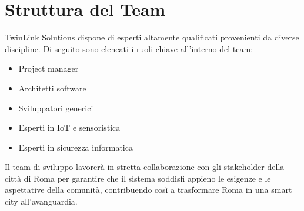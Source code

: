 \section{Struttura del Team}

TwinLink Solutions dispone di esperti altamente qualificati provenienti da diverse discipline. Di seguito sono elencati i ruoli chiave all'interno del team:

\begin{itemize}
    \item Project manager
    \item Architetti software
    \item Sviluppatori generici
    \item Esperti in IoT e sensoristica
    \item Esperti in sicurezza informatica
\end{itemize}

Il team di sviluppo lavorerà in stretta collaborazione con gli stakeholder della città di Roma per garantire che il sistema soddisfi appieno le esigenze e le aspettative della comunità, contribuendo così a trasformare Roma in una smart city all'avanguardia.
